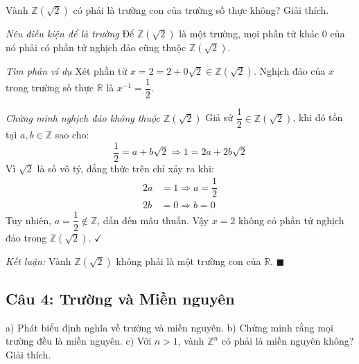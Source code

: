 \begin{questionbox}
Vành $\mathbb{Z}(\sqrt{2})$ có phải là trường con của trường số thực không? Giải thích.
\end{questionbox}

\begin{solution}
\textit{Nêu điều kiện để là trường}
Để $\mathbb{Z}(\sqrt{2})$ là một trường, mọi phần tử khác 0 của nó phải có phần tử nghịch đảo cũng thuộc $\mathbb{Z}(\sqrt{2})$.

\textit{Tìm phản ví dụ}
Xét phần tử $x = 2 = 2 + 0\sqrt{2} \in \mathbb{Z}(\sqrt{2})$.
Nghịch đảo của $x$ trong trường số thực $\mathbb{R}$ là $x^{-1} = \dfrac{1}{2}$.

\textit{Chứng minh nghịch đảo không thuộc $\mathbb{Z}(\sqrt{2})$}
Giả sử $\dfrac{1}{2} \in \mathbb{Z}(\sqrt{2})$, khi đó tồn tại $a, b \in \mathbb{Z}$ sao cho:
\[
    \dfrac{1}{2} = a + b\sqrt{2} \Rightarrow 1 = 2a + 2b\sqrt{2}
\]
Vì $\sqrt{2}$ là số vô tỷ, đẳng thức trên chỉ xảy ra khi:
\begin{align*}
    2a &= 1 \Rightarrow a = \dfrac{1}{2} \\
    2b &= 0 \Rightarrow b = 0
\end{align*}
Tuy nhiên, $a = \dfrac{1}{2} \notin \mathbb{Z}$, dẫn đến mâu thuẫn.
Vậy $x = 2$ không có phần tử nghịch đảo trong $\mathbb{Z}(\sqrt{2})$. $\checkmark$

\textit{Kết luận:} Vành $\mathbb{Z}(\sqrt{2})$ không phải là một trường con của $\mathbb{R}$. $\blacksquare$
\end{solution}

\subsection*{Câu 4: Trường và Miền nguyên}

\begin{questionbox}
a) Phát biểu định nghĩa về trường và miền nguyên. b) Chứng minh rằng mọi trường đều là miền nguyên. c) Với $n > 1$, vành $\mathbb{Z}^n$ có phải là miền nguyên không? Giải thích.
\end{questionbox}

